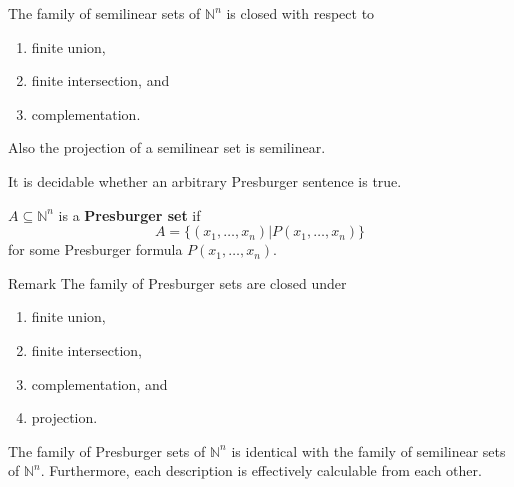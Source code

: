 \documentclass{beamer}
\newcommand{\N}{\mathbb{N}}
\begin{document}
\begin{frame}

\begin{theorem}[1.1]\label{thm : semi sub are closed under}
The family of semilinear sets of $\N ^n$ is closed with respect to 
\begin{enumerate}
\item finite union, 
\item finite intersection, and 
\item complementation. 
\end{enumerate}

Also the projection of a semilinear set is semilinear.
\end{theorem}

\end{frame}

\begin{frame}

\begin{theorem}[1.2]\label{thm : Presburger sentences are decidable}
It is decidable whether an arbitrary Presburger sentence is true.
\end{theorem}

\begin{definition}\label{defn : Presburger set}
$A \subseteq \N ^n$ is a \textbf{Presburger set} if 
\[ A = \{ (x_1,\dots,x_n) | P(x_1,\dots,x_n) \} \]
for some Presburger formula $P(x_1,\dots,x_n)$.
\end{definition}

\begin{block}{Remark}
The family of Presburger sets are closed under
\begin{enumerate}
\item finite union,
\item finite intersection,
\item complementation, and
\item projection.
\end{enumerate}
\end{block}

\end{frame}

\begin{frame}

\begin{theorem}[1.3]\label{thm 1.3}
The family of Presburger sets of $\N ^n$ is identical with the family of semilinear sets of $\N ^n$. Furthermore, each
description is effectively calculable from each other.
\end{theorem}

\end{frame}
\end{document}
